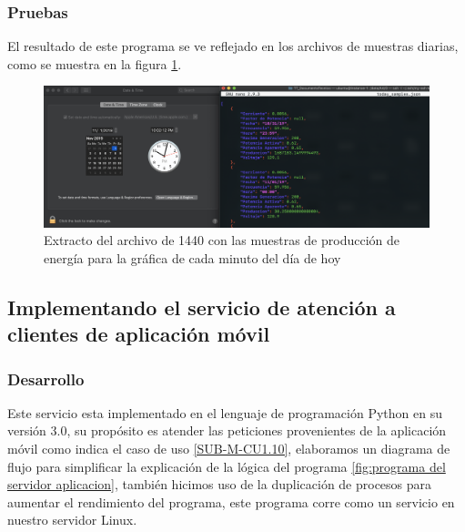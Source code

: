 \subsubsection{Pruebas}

El resultado de este programa se ve reflejado en los archivos de muestras diarias, como se muestra en la figura \ref{fig:muestras diarias}.

\begin{figure}[H]
	\centering
	\includegraphics[scale=.3]{Capitulo5/images/today.png}
	\caption{Extracto del archivo de 1440 con las muestras de producción de energía para la gráfica de cada minuto del día de hoy}
	\label{fig:muestras diarias}
\end{figure} 

\subsection{Implementando el servicio de atención a clientes de aplicación móvil}

\subsubsection{Desarrollo}

Este servicio esta implementado en el lenguaje de programación Python en su versión 3.0, su propósito es atender las peticiones provenientes de la aplicación móvil como indica el caso de uso \ref{SUB-M-CU1.10}, elaboramos un diagrama de flujo para simplificar la explicación de la lógica del programa \ref{fig:programa del servidor aplicacion}, también hicimos uso de la duplicación de procesos para aumentar el rendimiento del programa, este programa corre como un servicio en nuestro servidor Linux.

